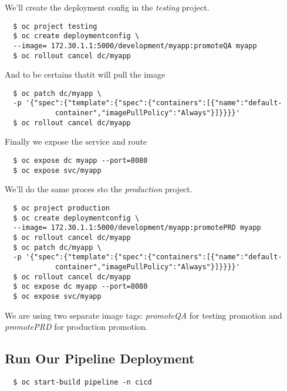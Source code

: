 We'll create the deployment config in the \textit{testing} project.

\begin{verbatim}
  $ oc project testing
  $ oc create deploymentconfig \
  --image= 172.30.1.1:5000/development/myapp:promoteQA myapp
  $ oc rollout cancel dc/myapp
\end{verbatim}

And to be certains thatit  will pull the image

\begin{verbatim}
  $ oc patch dc/myapp \
  -p '{"spec":{"template":{"spec":{"containers":[{"name":"default-
            container","imagePullPolicy":"Always"}]}}}}'
  $ oc rollout cancel dc/myapp
\end{verbatim}

Finally we expose the service and route

\begin{verbatim}
  $ oc expose dc myapp --port=8080
  $ oc expose svc/myapp
\end{verbatim}

We'll do the same proces sto the \textit{production} project.

\begin{verbatim}
  $ oc project production
  $ oc create deploymentconfig \
  --image= 172.30.1.1:5000/development/myapp:promotePRD myapp
  $ oc rollout cancel dc/myapp
  $ oc patch dc/myapp \
  -p '{"spec":{"template":{"spec":{"containers":[{"name":"default-
            container","imagePullPolicy":"Always"}]}}}}'
  $ oc rollout cancel dc/myapp
  $ oc expose dc myapp --port=8080
  $ oc expose svc/myapp
\end{verbatim}

We are using two separate image tags: \textit{promoteQA} for testing promotion and \textit{promotePRD} for production promotion.

\subsection{Run Our Pipeline Deployment}
\begin{verbatim}
  $ oc start-build pipeline -n cicd
\end{verbatim}